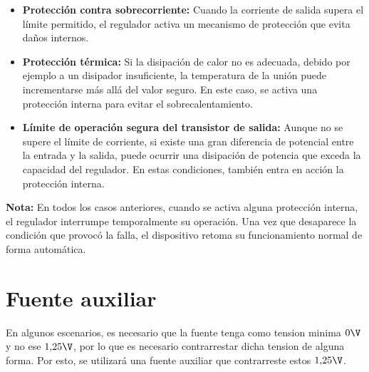   \begin{itemize}
      \item \textbf{Protección contra sobrecorriente:} Cuando la corriente de salida supera el límite permitido, 
        el regulador activa un mecanismo de protección que evita daños internos.

      \item \textbf{Protección térmica:} Si la disipación de calor no es adecuada, debido por ejemplo a un 
        disipador insuficiente, la temperatura de la unión puede incrementarse más allá del valor seguro. En este caso, se activa una protección interna para evitar el sobrecalentamiento.

      \item \textbf{Límite de operación segura del transistor de salida:} Aunque no se supere el límite de 
        corriente, si existe una gran diferencia de potencial entre la entrada y la salida, puede ocurrir una 
        disipación de potencia que exceda la capacidad del regulador. En estas condiciones, también entra en 
        acción la protección interna.
  \end{itemize}
 
  \textbf{Nota:} En todos los casos anteriores, cuando se activa alguna protección interna, el regulador 
    interrumpe temporalmente su operación. Una vez que desaparece la condición que provocó la falla, el 
    dispositivo retoma su funcionamiento normal de forma automática.

\section{Fuente auxiliar}
  En algunos escenarios, es necesario que la fuente tenga como tension minima $0\V$ y no ese $1{,}25\V$, por lo
  que es necesario contrarrestar dicha tension de alguna forma. Por esto, se utilizará una fuente auxiliar
  que contrarreste estos $1{,}25\V$.
